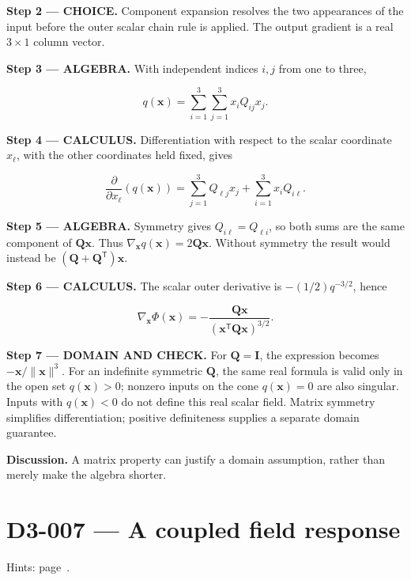 \documentclass[11pt,oneside,openany]{book}
\begin{document}
\begin{ChoiceStep}
\textbf{Step 2 --- CHOICE.} Component expansion resolves the two appearances of the input before the outer scalar chain rule is applied. The output gradient is a real \(3\times1\) column vector.

\end{ChoiceStep}
\begingroup\color{AlgebraBlue}
\textbf{Step 3 --- ALGEBRA.} With independent indices \(i,j\) from one to three,

\[
q(\mathbf x)=\sum_{i=1}^3\sum_{j=1}^3 x_i Q_{ij}x_j.
\]

\endgroup
\textbf{Step 4 --- CALCULUS.} Differentiation with respect to the scalar coordinate \(x_\ell\), with the other coordinates held fixed, gives

\[
\frac{\partial}{\partial x_\ell}\left(q(\mathbf x)\right)
=\sum_{j=1}^3Q_{\ell j}x_j+\sum_{i=1}^3x_iQ_{i\ell}.
\]

\begingroup\color{AlgebraBlue}
\textbf{Step 5 --- ALGEBRA.} Symmetry gives \(Q_{i\ell}=Q_{\ell i}\), so both sums are the same component of \(\mathbf Q\mathbf x\). Thus \(\nabla_{\mathbf x}q(\mathbf x)=2\mathbf Q\mathbf x\). Without symmetry the result would instead be \((\mathbf Q+\mathbf Q^{\mathsf T})\mathbf x\).

\endgroup
\textbf{Step 6 --- CALCULUS.} The scalar outer derivative is \(-(1/2)q^{-3/2}\), hence

\[
\nabla_{\mathbf x}\Phi(\mathbf x)
=-\frac{\mathbf Q\mathbf x}{(\mathbf x^{\mathsf T}\mathbf Q\mathbf x)^{3/2}}.
\]

\begin{DomainStep}
\textbf{Step 7 --- DOMAIN AND CHECK.} For \(\mathbf Q=\mathbf I\), the expression becomes \(-\mathbf x/\|\mathbf x\|^3\). For an indefinite symmetric \(\mathbf Q\), the same real formula is valid only in the open set \(q(\mathbf x)>0\); nonzero inputs on the cone \(q(\mathbf x)=0\) are also singular. Inputs with \(q(\mathbf x)<0\) do not define this real scalar field. Matrix symmetry simplifies differentiation; positive definiteness supplies a separate domain guarantee.

\end{DomainStep}
\textbf{Discussion.} A matrix property can justify a domain assumption, rather than merely make the algebra shorter.
\clearpage
\section{D3-007 --- A coupled field response}
\label{problem:D3-007}
{\small Hints: page~\pageref{hints:D3-007}.}\par\medskip
\end{document}
